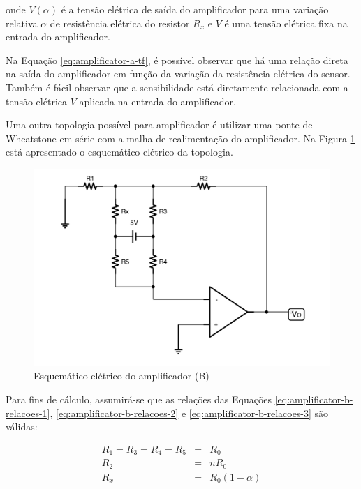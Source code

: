 \documentclass[a4paper]{instrumentacao}
\begin{document}
\noindent onde $V(\alpha)$ é a tensão elétrica de saída do amplificador para uma variação relativa $\alpha$ de resistência elétrica do resistor $R_x$ e $V$ é uma tensão elétrica fixa na entrada do amplificador.

Na Equação \ref{eq:amplificator-a-tf}, é possível observar que há uma relação direta na saída do amplificador em função da variação da resistência elétrica do sensor. Também é fácil observar que a sensibilidade está diretamente relacionada com a tensão elétrica $V$ aplicada na entrada do amplificador.


Uma outra topologia possível para amplificador é utilizar uma ponte de Wheatstone em série com a malha de realimentação do amplificador. Na Figura \ref{fig:amplificador-b} está apresentado o esquemático elétrico da topologia.

\begin{figure}[H]
\center
\includegraphics[width=\textwidth]{Amplificador-B.pdf}
\caption{Esquemático elétrico do amplificador (B)}
\label{fig:amplificador-b}
\end{figure}

Para fins de cálculo, assumirá-se que as relações das Equações \ref{eq:amplificator-b-relacoes-1}, \ref{eq:amplificator-b-relacoes-2} e \ref{eq:amplificator-b-relacoes-3} são válidas:

\begin{eqnarray}
	R_1 = R_3 = R_4 = R_5 &=& R_0 \label{eq:amplificator-b-relacoes-1} \\
	R_2 &=& n R_0 \\ 		\label{eq:amplificator-b-relacoes-2} 
	R_x &=& R_0(1-\alpha) 	\label{eq:amplificator-b-relacoes-3} 
\end{eqnarray}
\end{document}
